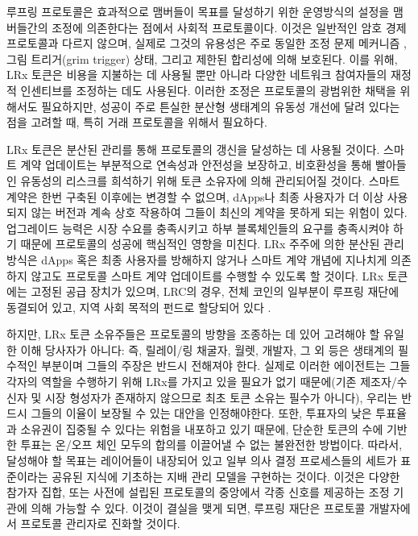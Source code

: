 \documentclass{article}
\begin{document}
\begin{multicols}{2}
루프링 프로토콜은 효과적으로 맴버들이 목표를 달성하기 위한 운영방식의 설정을 맴버들간의 조정에 의존한다는 점에서 사회적 프로토콜이다. 이것은 일반적인 암호 경제 프로토콜과 다르지 않으며, 실제로 그것의 유용성은 주로 동일한 조정 문제 메커니즘 \cite{vitalikgovernance}, 그림 트리거(grim trigger) 상태, 그리고 제한된 합리성에 의해 보호된다. 이를 위해, LRx 토큰은 비용을 지불하는 데 사용될 뿐만 아니라 다양한 네트워크 참여자들의 재정적 인센티브를 조정하는 데도 사용된다. 이러한 조정은 프로토콜의 광범위한 채택을 위해서도 필요하지만, 성공이 주로 튼실한 분산형 생태계의 유동성 개선에 달려 있다는 점을 고려할 때, 특히 거래 프로토콜을 위해서 필요하다.

LRx 토큰은 분산된 관리를 통해 프로토콜의 갱신을 달성하는 데 사용될 것이다. 스마트 계약 업데이트는 부분적으로 연속성과 안전성을 보장하고, 비호환성을 통해 빨아들인 유동성의 리스크를 희석하기 위해 토큰 소유자에 의해 관리되어질 것이다. 스마트 계약은 한번 구축된 이후에는 변경할 수 없으며, dApps나 최종 사용자가 더 이상 사용되지 않는 버전과 계속 상호 작용하여 그들이 최신의 계약을 못하게 되는 위험이 있다. 업그레이드 능력은 시장 수요를 충족시키고 하부 블록체인들의 요구를 충족시켜야 하기 때문에 프로토콜의 성공에 핵심적인 영향을 미친다.
LRx 주주에 의한 분산된 관리 방식은 dApps 혹은 최종 사용자를 방해하지 않거나 스마트 계약 개념에 지나치게 의존하지 않고도 프로토콜 스마트 계약 업데이트를 수행할 수 있도록 할 것이다. LRx 토큰에는 고정된 공급 장치가 있으며, LRC의 경우, 전체 코인의 일부분이 루프링 재단에 동결되어 있고, 지역 사회 목적의 펀드로 할당되어 있다 \cite{LRCtokendoc}.

하지만, LRx 토큰 소유주들은 프로토콜의 방향을 조종하는 데 있어 고려해야 할 유일한 이해 당사자가 아니다: 즉, 릴레이/링 채굴자, 월렛, 개발자, 그 외 등은 생태계의 필수적인 부분이며 그들의 주장은 반드시 전해져야 한다.  실제로 이러한 에이전트는 그들 각자의 역할을 수행하기 위해 LRx를 가지고 있을 필요가 없기 때문에(기존 제조자/수신자 및 시장 형성자가 존재하지 않으므로 최초 토큰 소유는 필수가 아니다), 우리는 반드시 그들의 이율이 보장될 수 있는 대안을 인정해야한다. 또한, 투표자의 낮은 투표율과 소유권이 집중될 수 있다는 위험을 내포하고 있기 때문에, 단순한 토큰의 수에 기반 한 투표는 온/오프 체인 모두의 합의를 이끌어낼 수 없는 불완전한 방법이다.  따라서, 달성해야 할 목표는 레이어들이 내장되어 있고 일부 의사 결정 프로세스들의 세트가 표준이라는 공유된 지식에 기초하는 지배 관리 모델을 구현하는 것이다.  이것은 다양한 참가자 집합, 또는 사전에 설립된 프로토콜의 중앙에서 각종 신호를 제공하는 조정 기관에 의해 가능할 수 있다. 이것이 결실을 맺게 되면, 루프링 재단은 프로토콜 개발자에서 프로토콜 관리자로 진화할 것이다.




\end{multicols}
\end{document}
